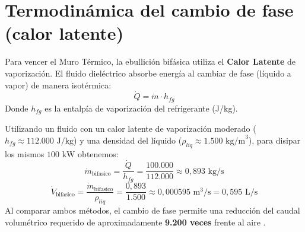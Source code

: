 \section{Termodin\'amica del cambio de fase (calor latente)}\label{sec:calor_latente}
Para vencer el Muro T\'ermico, la ebullici\'on bif\'asica utiliza el \textbf{Calor Latente} de vaporizaci\'on. El fluido diel\'ectrico absorbe energ\'ia al cambiar de fase (l\'iquido a vapor) de manera isot\'ermica:
\begin{equation}\label{eq:calor_latente}
\dot{Q} = \dot{m} \cdot h_{fg}
\end{equation}
Donde $h_{fg}$ es la entalp\'ia de vaporizaci\'on del refrigerante (J/kg).

Utilizando un fluido con un calor latente de vaporizaci\'on moderado ($h_{fg} \approx 112.000\text{ J/kg}$) y una densidad del l\'iquido ($\rho_{liq} \approx 1.500\text{ kg/m}^3$), para disipar los mismos $100\text{ kW}$ obtenemos:
\begin{equation}
\dot{m}_{\text{bifasico}} = \frac{\dot{Q}}{h_{fg}} = \frac{100.000}{112.000} \approx 0,893\text{ kg/s}
\end{equation}
\begin{equation}
\dot{V}_{\text{bifasico}} = \frac{\dot{m}_{\text{bifasico}}}{\rho_{liq}} = \frac{0,893}{1.500} \approx 0,000595\text{ m}^3\text{/s} = 0,595\text{ L/s}
\end{equation}
Al comparar ambos m\'etodos, el cambio de fase permite una reducci\'on del caudal volum\'etrico requerido de aproximadamente \textbf{9.200 veces} frente al aire \cite{webb2005}.

